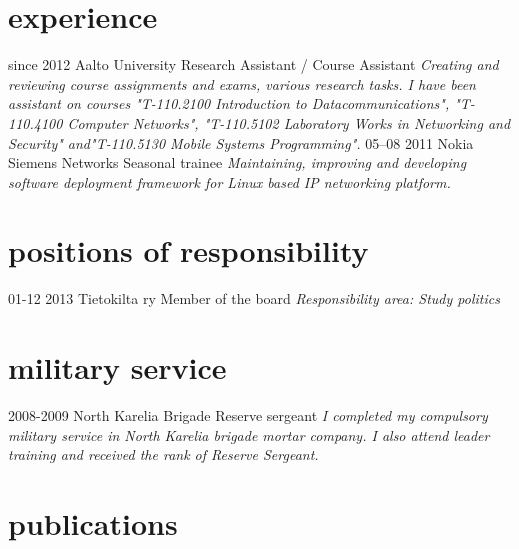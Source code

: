 \documentclass[]{friggeri-cv}
\begin{document}
\section{experience}

\begin{entrylist}
  \entry
    {since 2012}
    {Aalto University}
    {Research Assistant / Course Assistant}
    {\emph{Creating and reviewing course assignments and exams, various research tasks. I have been assistant on courses "T-110.2100 Introduction to Datacommunications", "T-110.4100 Computer Networks", "T-110.5102 Laboratory Works in Networking and Security" and"T-110.5130 Mobile Systems Programming".}}
  \entry
    {05–08 2011}
    {Nokia Siemens Networks}
    {Seasonal trainee}
    {\emph{Maintaining, improving and developing software deployment framework for Linux based IP networking platform.}}
\end{entrylist}

\section{positions of responsibility}
  \begin{entrylist}
    \entry
      {01-12 2013}
      {Tietokilta ry}
      {Member of the board}
      {\emph{Responsibility area: Study politics}}
  \end{entrylist}

\section{military service}
  \begin{entrylist}
    \entry
      {2008-2009}
      {North Karelia Brigade}
      {Reserve sergeant}
      {\emph{I completed my compulsory military service in North Karelia brigade mortar company. I also attend leader training and received the rank of Reserve Sergeant.}}
  \end{entrylist}

\section{publications}
\end{document}
